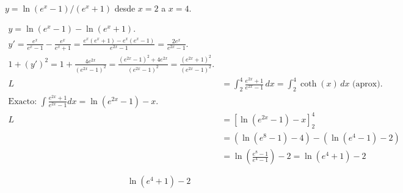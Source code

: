 $y=\ln(e^x-1)/(e^x+1)$ desde $x=2$ a $x=4$.

\nopagebreak
\begin{align*}
y = \ln(e^x-1) - \ln(e^x+1). \\
y' = \frac{e^x}{e^x-1} - \frac{e^x}{e^x+1} = \frac{e^x(e^x+1) - e^x(e^x-1)}{e^{2x}-1} = \frac{2e^x}{e^{2x}-1}. \\
1+(y')^2 = 1 + \frac{4e^{2x}}{(e^{2x}-1)^2} = \frac{(e^{2x}-1)^2 + 4e^{2x}}{(e^{2x}-1)^2} = \frac{(e^{2x}+1)^2}{(e^{2x}-1)^2}. \\
L &= \int_{2}^{4} \frac{e^{2x}+1}{e^{2x}-1} \, dx = \int_{2}^{4} \coth(x) \, dx \text{ (aprox)}. \\
\text{Exacto: } \int \frac{e^{2x}+1}{e^{2x}-1} dx = \ln(e^{2x}-1) - x. \\
L &= [\ln(e^{2x}-1) - x]_{2}^{4} \\
&= (\ln(e^8-1) - 4) - (\ln(e^4-1) - 2) \\
&= \ln\left(\frac{e^8-1}{e^4-1}\right) - 2 = \ln(e^4+1) - 2
\end{align*}

\[
\boxed{\displaystyle \ln(e^4+1) - 2}
\]
